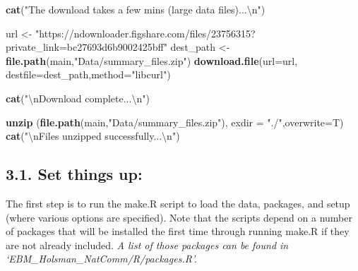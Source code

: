 \documentclass[]{article}
\newenvironment{Shaded}{\begin{snugshade}}{\end{snugshade}}
\newcommand{\KeywordTok}[1]{\textcolor[rgb]{0.13,0.29,0.53}{\textbf{{#1}}}}
\newcommand{\DataTypeTok}[1]{\textcolor[rgb]{0.13,0.29,0.53}{{#1}}}
\newcommand{\CharTok}[1]{\textcolor[rgb]{0.31,0.60,0.02}{{#1}}}
\newcommand{\StringTok}[1]{\textcolor[rgb]{0.31,0.60,0.02}{{#1}}}
\newcommand{\NormalTok}[1]{{#1}}
\begin{document}
\begin{Shaded}
\begin{Highlighting}[]
    \KeywordTok{cat}\NormalTok{(}\StringTok{"The download takes a few mins (large data files)...}\CharTok{\textbackslash{}n}\StringTok{"}\NormalTok{)}

    \NormalTok{url       <-}\StringTok{ "https://ndownloader.figshare.com/files/23756315?private_link=bc27693d6b9002425bff"}
    \NormalTok{dest_path  <-}\StringTok{  }\KeywordTok{file.path}\NormalTok{(main,}\StringTok{"Data/summary_files.zip"}\NormalTok{)}
    \KeywordTok{download.file}\NormalTok{(}\DataTypeTok{url=}\NormalTok{url, }\DataTypeTok{destfile=}\NormalTok{dest_path,}\DataTypeTok{method=}\StringTok{"libcurl"}\NormalTok{)}
    
    \KeywordTok{cat}\NormalTok{(}\StringTok{"}\CharTok{\textbackslash{}n}\StringTok{Download complete...}\CharTok{\textbackslash{}n}\StringTok{"}\NormalTok{)}
    
    \KeywordTok{unzip} \NormalTok{(}\KeywordTok{file.path}\NormalTok{(main,}\StringTok{"Data/summary_files.zip"}\NormalTok{), }\DataTypeTok{exdir =} \StringTok{"./"}\NormalTok{,}\DataTypeTok{overwrite=}\NormalTok{T)}
    \KeywordTok{cat}\NormalTok{(}\StringTok{"}\CharTok{\textbackslash{}n}\StringTok{Files unzipped successfully...}\CharTok{\textbackslash{}n}\StringTok{"}\NormalTok{)}
\end{Highlighting}
\end{Shaded}

\subsection{3.1. Set things up:}\label{set-things-up}

The first step is to run the make.R script to load the data, packages,
and setup (where various options are specified). Note that the scripts
depend on a number of packages that will be installed the first time
through running make.R if they are not already included. \emph{A list of
those packages can be found in `EBM\_Holsman\_NatComm/R/packages.R'.}
\end{document}
